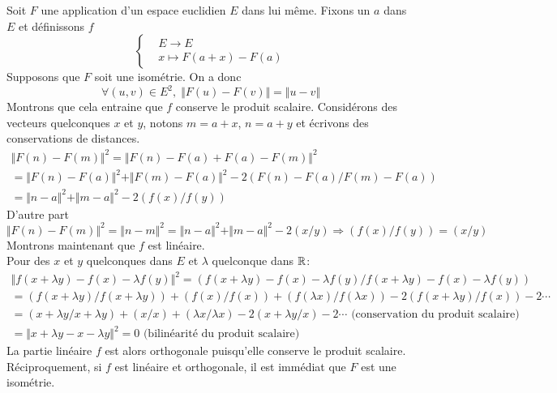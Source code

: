 \begin{demo}Soit $F$ une application d'un espace euclidien $E$ dans lui même. Fixons un $a$ dans $E$ et définissons $f$ 
\begin{displaymath}
 \left\lbrace 
\begin{aligned}
 &E \rightarrow E\\
 &x \mapsto F(a+x) - F(a)
\end{aligned}
\right. 
\end{displaymath}
Supposons que $F$ soit une isométrie. On a donc
\begin{displaymath}
 \forall(u,v)\in E^2,\; \Vert F(u)-F(v)\Vert = \Vert u-v\Vert
\end{displaymath}
Montrons que cela entraine que $f$ conserve le produit scalaire.\newline
Considérons des vecteurs quelconques $x$ et $y$, notons $m=a+x$, $n=a+y$ et écrivons des conservations de distances.
\begin{multline*}
\Vert F(n)-F(m) \Vert ^2 = \Vert F(n)-F(a) +F(a)-F(m) \Vert ^2 \\
= \Vert F(n)-F(a) \Vert ^2 + \Vert F(m)-F(a) \Vert ^2 - 2(F(n)-F(a)/F(m)-F(a)) \\
= \Vert n-a \Vert^2 + \Vert m-a\Vert ^2 - 2(f(x)/f(y))
\end{multline*}
D'autre part
\begin{displaymath}
 \Vert F(n)-F(m) \Vert ^2 = \Vert n-m \Vert ^2 = \Vert n-a \Vert^2 + \Vert m-a\Vert ^2 - 2(x/y) 
\Rightarrow (f(x)/f(y))=(x/y)
\end{displaymath}
Montrons maintenant que $f$ est linéaire.\\
Pour des $x$ et $y$ quelconques dans $E$ et $\lambda$ quelconque dans $\mathbb{R}$:
\begin{multline*}
 \Vert f(x+\lambda y)-f(x)-\lambda f(y)\Vert^2
= \left( f(x+\lambda y)-f(x)-\lambda f(y)/f(x+\lambda y)-f(x)-\lambda f(y) \right)\\
= (f(x+\lambda y)/f(x+\lambda y)) +(f(x)/f(x))+(f(\lambda x)/f(\lambda x)) -2(f(x+\lambda y)/f(x))-2\cdots \\
= (x+\lambda y/x+\lambda y) +(x/x)+(\lambda x/\lambda x) -2(x+\lambda y/x)-2\cdots \text{ (conservation du produit scalaire)}\\ 
= \Vert x+\lambda y-x-\lambda y\Vert^2 = 0 \text{ (bilinéarité du produit scalaire)}
\end{multline*}
La partie linéaire $f$ est alors orthogonale puisqu'elle conserve le produit scalaire.\newline
Réciproquement, si $f$ est linéaire et orthogonale, il est immédiat que $F$ est une isométrie.
\end{demo}
